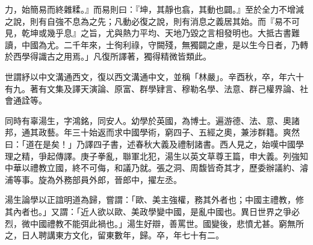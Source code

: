 \begin{pinyinscope}
力，始簡易而終雜糅。』而易則曰：『坤，其靜也翕，其動也闢。』至於全力不增減之說，則有自強不息為之先；凡動必復之說，則有消息之義居其始。而『易不可見，乾坤或幾乎息』之旨，尤與熱力平均、天地乃毀之言相發明也。大抵古書難讀，中國為尤。二千年來，士徇利祿，守闕殘，無獨闢之慮，是以生今日者，乃轉於西學得識古之用焉。」凡復所譯著，獨得精微皆類此。

世謂紓以中文溝通西文，復以西文溝通中文，並稱「林嚴」。辛酉秋，卒，年六十有九。著有文集及譯天演論、原富、群學肄言、穆勒名學、法意、群己權界論、社會通詮等。

同時有辜湯生，字鴻銘，同安人。幼學於英國，為博士。遍游德、法、意、奧諸邦，通其政藝。年三十始返而求中國學術，窮四子、五經之奧，兼涉群籍。爽然曰：「道在是矣！」乃譯四子書，述春秋大義及禮制諸書。西人見之，始嘆中國學理之精，爭起傳譯。庚子拳亂，聯軍北犯，湯生以英文草尊王篇，申大義。列強知中華以禮教立國，終不可侮，和議乃就。張之洞、周馥皆奇其才，歷委辦議約、濬浦等事。旋為外務部員外郎，晉郎中，擢左丞。

湯生論學以正誼明道為歸，嘗謂：「歐、美主強權，務其外者也；中國主禮教，修其內者也。」又謂：「近人欲以歐、美政學變中國，是亂中國也。異日世界之爭必烈，微中國禮教不能弭此禍也。」湯生好辯，善罵世。國變後，悲憤尤甚。窮無所之，日人聘講東方文化，留東數年，歸。卒，年七十有二。


\end{pinyinscope}